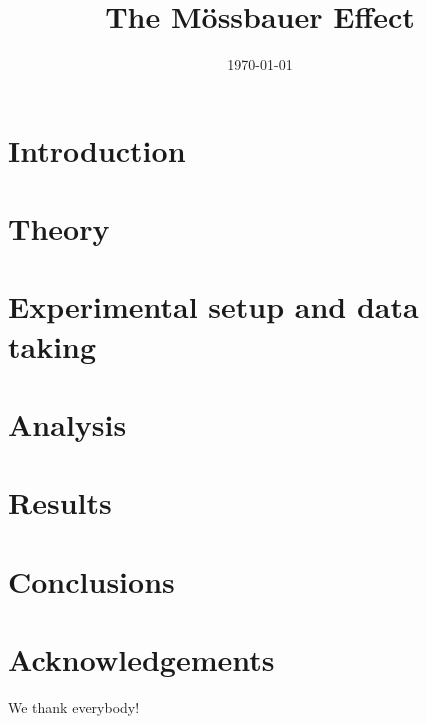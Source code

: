 \documentclass{atlasnote}
\title{The M\"ossbauer Effect}
\date{\today}
\begin{document}



\tableofcontents

\newpage

\section{Introduction}
\label{sec:intro}


\section{Theory}
\label{sec:theory}


\section{Experimental setup and data taking}
\label{sec:daq}


\section{Analysis}
\label{sec:analysis}


\section{Results}
\label{sec:results}


\section{Conclusions}
\label{sec:conclusion}


\section*{Acknowledgements}
We thank everybody!






\end{document}
